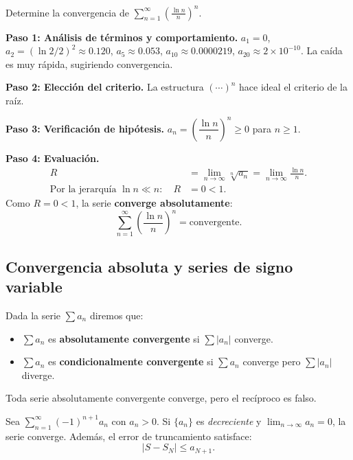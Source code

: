 \begin{example}
Determine la convergencia de $\displaystyle\sum_{n=1}^\infty
\left(\frac{\ln n}{n}\right)^n$.
\begin{myproof}
\textbf{Paso 1: Análisis de términos y comportamiento.}
$a_1 = 0$, $a_2 = (\ln 2/2)^2 \approx 0.120$, $a_5 \approx 0.053$,
$a_{10} \approx 0.0000219$, $a_{20} \approx 2\times 10^{-10}$. La caída
es muy rápida, sugiriendo convergencia.

\textbf{Paso 2: Elección del criterio.}
La estructura $(\cdots)^n$ hace ideal el criterio de la raíz.

\textbf{Paso 3: Verificación de hipótesis.}
$a_n = \left(\dfrac{\ln n}{n}\right)^n \geq 0$ para $n \geq 1$.

\textbf{Paso 4: Evaluación.}
\begin{align*}
  R &= \lim_{n\to\infty}\sqrt[n]{a_n}
     = \lim_{n\to\infty}\frac{\ln n}{n}. \\
  \text{Por la jerarquía } \ln n \ll n: \quad
  R &= 0 < 1.
\end{align*}
Como $R = 0 < 1$, la serie \textbf{converge absolutamente}:
\[
  \sum_{n=1}^\infty \left(\frac{\ln n}{n}\right)^n = \boxed{\text{convergente.}}
\]
\end{myproof}
\end{example}

\subsection{Convergencia absoluta y series de signo variable}

\begin{definition} Dada la serie $\sum a_n$ diremos que:
\begin{itemize}
  \item $\sum a_n$ es \textbf{absolutamente convergente} si $\sum|a_n|$
        converge.
  \item $\sum a_n$ es \textbf{condicionalmente convergente} si $\sum a_n$
        converge pero $\sum|a_n|$ diverge.
\end{itemize}
Toda serie absolutamente convergente converge, pero el recíproco es falso.
\end{definition}

\begin{theorem}
Sea $\displaystyle\sum_{n=1}^\infty(-1)^{n+1}a_n$ con $a_n > 0$. Si
$\{a_n\}$ es \emph{decreciente} y $\lim_{n\to\infty}a_n = 0$, la serie
converge. Además, el error de truncamiento satisface:
\[
  |S - S_N| \leq a_{N+1}.
\]
\end{theorem}

